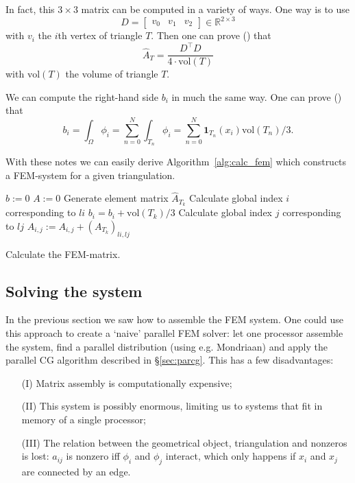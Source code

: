 \documentclass[11pt]{amsart}
\theoremstyle{definition}
\newcommand{\R}{\mathbb{R}}
\begin{document}
In fact, this $3 \times 3$ matrix can be computed in a variety of ways. One way is to use
\[
  D = \begin{bmatrix} v_{0} & v_{1} & v_{2} \end{bmatrix} \in \R^{ 2 \times 3}
\]
with $v_{i}$ the $i$th vertex of triangle $T$. Then one can prove (\cite{wiki}) that
\[
  \hat A_T = \frac{D^\top D}{4 \cdot \text{vol}(T)}
\]
with $\text{vol}(T)$ the volume of triangle $T$.

We can compute the right-hand side $b_i$ in much the same way. One can prove (\cite[\S2.3]{janadapt}) that
\[
  b_i = \int_\Omega \phi_i = \sum_{n=0}^N \int_{T_n} \phi_i
	= \sum_{n=0}^N \mathbf{1}_{T_n}(x_i)\text{vol}(T_n)/3.
\]

With these notes we can easily derive Algorithm~\ref{alg:calc_fem} which constructs a FEM-system for a given triangulation.

\begin{algorithm}[H]
	$b := 0$\;
	$A := 0$\;
	 {
		Generate element matrix $\hat A_{T_k}$\;
		 {
			Calculate global index $i$ corresponding to $li$\;
			 {
				$b_i = b_i + \text{vol}(T_k)/3$\;
				 {
					Calculate global index $j$ corresponding to $lj$\;
					 {
						$A_{i,j} := A_{i,j} + (A_{T_k})_{li,lj}$\;
					}
				}
			}
		}
	}
 \caption{Calculate the FEM-matrix.}
 \label{alg:calc_fem}
\end{algorithm}
\subsection{Solving the system}
In the previous section we saw how to assemble the FEM system. One could use this approach to create a `naive' parallel FEM solver: let one processor assemble the system, find a parallel distribution (using e.g. Mondriaan) and apply the parallel CG algorithm described in \S\ref{sec:parcg}. This has a few disadvantages:
\begin{enumerate}
  \item[(I)] Matrix assembly is computationally expensive;
  \item[(II)] This system is possibly enormous, limiting us to systems that fit in memory of a single processor;
  \item[(III)] The relation between the geometrical object, triangulation and nonzeros is lost: $a_{ij}$ is nonzero iff $\phi_i$ and $\phi_j$ interact, which only happens if $x_i$ and $x_j$ are connected by an edge.
\end{enumerate}
\end{document}
